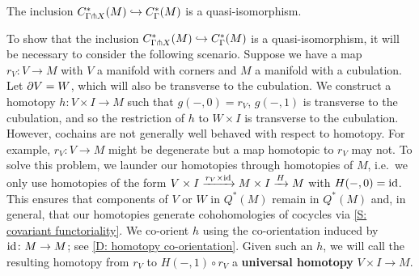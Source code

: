 \begin{theorem}\label{T: transverse complex}
The inclusion $C^*_{\Gamma \pitchfork X}(M) \hookrightarrow C^*_\Gamma(M)$ is a quasi-isomorphism.
\end{theorem}

To show that the inclusion $C^*_{\Gamma \pitchfork X}(M) \hookrightarrow C^*_\Gamma(M)$ is a quasi-isomorphism, it will be necessary to consider the following scenario. Suppose we have a map $r_V \colon V \to M$ with $V$ a manifold with corners and $M$ a manifold with a cubulation. Let $\partial V = W$, which will also be transverse to the cubulation. We construct a homotopy $h \colon V \times I \to M$ such that $g(-,0) = r_V$, $g(-,1)$ is transverse to the cubulation, and so the restriction of $h$ to $W \times I$ is transverse to the cubulation.
However, cochains are not generally well behaved with respect to homotopy. For example, $r_V \colon V \to M$ might be degenerate but a map homotopic to $r_V$ may not. To solve this problem, we launder our homotopies through homotopies of $M$, i.e.\ we only use homotopies of the form $V \times I \xrightarrow{r_V \times \mathrm{id}} M \times I \xrightarrow{H} M$ with $H(-,0) = \mathrm{id}$. This ensures that components of $V$ or $W$ in $Q^*(M)$ remain in $Q^*(M)$ and, in general, that our homotopies generate cohohomologies of cocycles via
\cref{S: covariant functoriality}. We co-orient $h$ using the co-orientation induced by $\mathrm{id} \colon M \to M$; see \cref{D: homotopy co-orientation}. Given such an $h$, we will call the resulting homotopy from $r_V$ to $H(-,1) \circ r_V$ a \textbf{universal homotopy} $V \times I \to M$.

